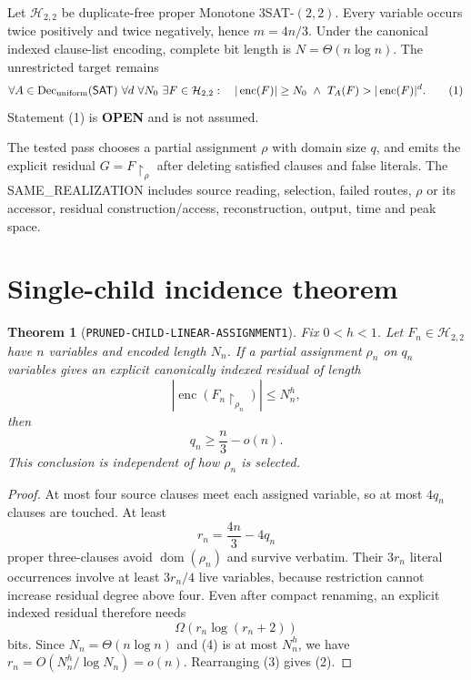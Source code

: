 \documentclass[11pt]{article}
\newtheorem{theorem}{Theorem}
\newcommand{\SAT}{\mathsf{SAT}}
\newcommand{\Htwo}{\mathcal H_{2,2}}
\newcommand{\OPEN}{\textbf{OPEN}}
\begin{document}
Let $\Htwo$ be duplicate-free proper Monotone $3$SAT-$(2,2)$.  Every
variable occurs twice positively and twice negatively, hence $m=4n/3$.
Under the canonical indexed clause-list encoding, complete bit length is
$N=\Theta(n\log n)$.  The unrestricted target remains
\[
 \forall A\in\operatorname{Dec}_{\rm uniform}(\SAT)\ \forall d\ \forall N_0\
 \exists F\in\Htwo:\quad |\operatorname{enc}(F)|\ge N_0\ \land\
 T_A(F)>|\operatorname{enc}(F)|^d.                       \tag{1}
\]
Statement (1) is \OPEN{} and is not assumed.

The tested pass chooses a partial assignment $\rho$ with domain size $q$,
and emits the explicit residual $G=F\upharpoonright_\rho$ after deleting
satisfied clauses and false literals.  The SAME\_REALIZATION includes
source reading, selection, failed routes, $\rho$ or its accessor, residual
construction/access, reconstruction, output, time and peak space.

\section{Single-child incidence theorem}

\begin{theorem}[\texttt{PRUNED-CHILD-LINEAR-ASSIGNMENT1}]
Fix $0<h<1$.  Let $F_n\in\Htwo$ have $n$ variables and encoded length $N_n$.
If a partial assignment $\rho_n$ on $q_n$ variables gives an explicit
canonically indexed residual of length
\[
 |\operatorname{enc}(F_n\upharpoonright_{\rho_n})|\le N_n^h,
\]
then
\[
 q_n\ge \frac n3-o(n).                                  \tag{2}
\]
This conclusion is independent of how $\rho_n$ is selected.
\end{theorem}

\begin{proof}
At most four source clauses meet each assigned variable, so at most $4q_n$
clauses are touched.  At least
\[
 r_n=\frac{4n}{3}-4q_n                                  \tag{3}
\]
proper three-clauses avoid $\operatorname{dom}(\rho_n)$ and survive verbatim.
Their $3r_n$ literal occurrences involve at least $3r_n/4$ live variables,
because restriction cannot increase residual degree above four.  Even after
compact renaming, an explicit indexed residual therefore needs
\[
 \Omega(r_n\log(r_n+2))                                 \tag{4}
\]
bits.  Since $N_n=\Theta(n\log n)$ and (4) is at most $N_n^h$, we have
$r_n=O(N_n^h/\log N_n)=o(n)$.  Rearranging (3) gives (2).
\end{proof}
\end{document}
